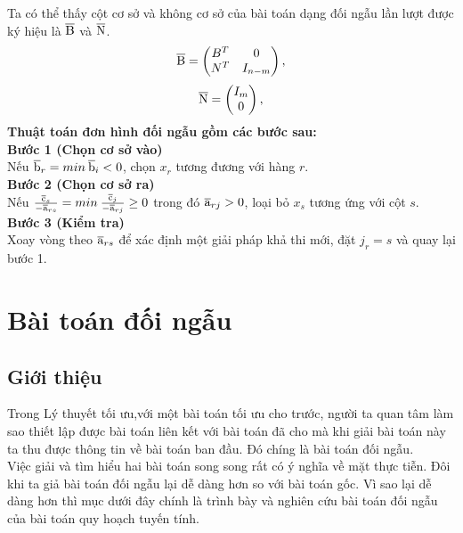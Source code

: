 \documentclass{article}
\begin{document}
\begin{enumerate}
                Ta có thể thấy cột cơ sở và không cơ sở của bài toán dạng đối ngẫu lần lượt được ký hiệu là $\overline{\rm B}$ và $\overline{\rm N}$.
                \begin{gather}
                    \overline{\rm B} =
                        \begin{pmatrix}
                            B^T & 0 \\
                            N^T & I_{n-m}
                        \end{pmatrix}
                        ,
                \end{gather}
                \begin{gather}
                    \overline{\rm N}=
                        \begin{pmatrix}
                            I_m \\
                            0
                        \end{pmatrix}
                        ,
                \end{gather}
                \textbf{Thuật toán đơn hình đối ngẫu gồm các bước sau:} \\
                    \textbf{Bước 1 (Chọn cơ sở vào)} \\
                        Nếu $\overline{\rm b}_r=min \: \overline{\rm b}_i < 0$, chọn $x_r$ tương đương với hàng $r$. \\
                    \textbf{Bước 2 (Chọn cơ sở ra)} \\
                        Nếu $\frac{\overline{\rm c}_s}{-\overline{\rm a}_{rs}}=min \: \frac{\overline{\rm c}_j}{-\overline{\rm a}_{rj}} \geq 0$ trong đó $\overline{\rm a}_{rj} > 0$, loại bỏ $x_s$ tương ứng với cột $s$. \\
                    \textbf{Bước 3 (Kiểm tra)} \\
                        Xoay vòng theo $\overline{\rm a}_{rs}$ để xác định một giải pháp khả thi mới, đặt $j_r=s$ và quay lại bước 1.
                \end{enumerate}
\section{Bài toán đối ngẫu}
    \subsection{Giới thiệu}
        Trong Lý thuyết tối ưu,với một bài toán tối ưu cho trước, người ta quan tâm làm sao thiết lập được bài toán liên kết với bài toán đã cho mà khi giải bài toán này ta thu được thông tin về bài toán ban đầu. Đó chíng là bài toán đối ngẫu. \\
        Việc giải và tìm hiểu hai bài toán song song rất có ý nghĩa về mặt thực tiễn. Đôi khi ta giả bài toán đối ngẫu lại dễ dàng hơn so với bài toán gốc. Vì sao lại dễ dàng hơn thì mục dưới đây chính là trình bày và nghiên cứu bài toán đối ngẫu của bài toán quy hoạch tuyến tính.
\end{document}
